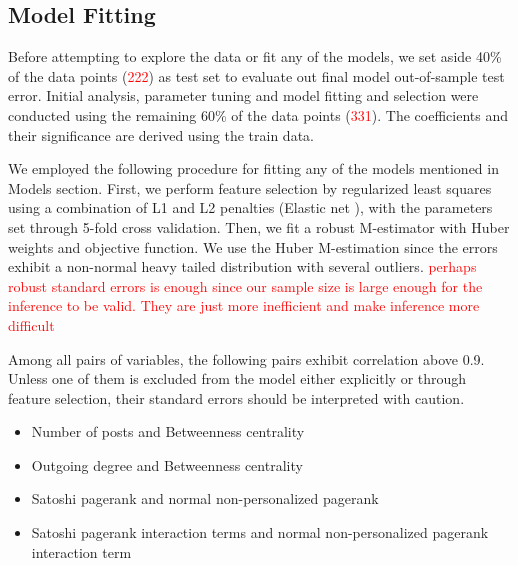 \subsection{Model Fitting}
Before attempting to explore the data or fit any of the models, we set aside 40\% of the data points (\textcolor{red}{222}) as test set to evaluate out final model out-of-sample test error. Initial analysis, parameter tuning and model fitting and selection were conducted using the remaining 60\% of the data points (\textcolor{red}{331}). The coefficients and their significance are derived using the train data.

We employed the following procedure for fitting any of the models mentioned in Models section. First, we perform feature selection by regularized least squares using a combination of L1 and L2 penalties (Elastic net \cite{ElasticNet}), with the parameters set through 5-fold cross validation. Then, we fit a robust M-estimator with Huber weights and objective function. We use the Huber M-estimation since the errors exhibit a non-normal heavy tailed distribution with several outliers. \textcolor{red}{perhaps robust standard errors is enough since our sample size is large enough for the inference to be valid. They are just more inefficient and make inference more difficult}

Among all pairs of variables, the following pairs exhibit correlation above 0.9. Unless one of them is excluded from the model either explicitly or through feature selection, their standard errors should be interpreted with caution.
\begin{itemize} [topsep=0pt,itemsep=-0.5ex,partopsep=1ex,parsep=1ex]
 \item Number of posts and Betweenness centrality
 \item Outgoing degree and Betweenness centrality
 \item Satoshi pagerank and normal non-personalized pagerank
 \item Satoshi pagerank interaction terms and normal non-personalized pagerank interaction term
\end{itemize}





